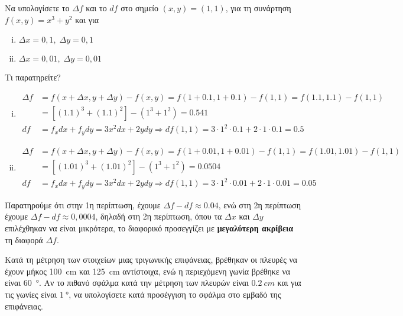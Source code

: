 \begin{example}
  Να υπολογίσετε το $ \Delta f $ και το $ df $ στο σημείο $ (x,y) = (1,1) $, 
  για τη συνάρτηση $ f(x,y) = x^{3}+y^{2} $ και για 
  \begin{enumerate}[i)]
    \item $ \Delta x = 0,1, \; \Delta y = 0,1 $
    \item $ \Delta x = 0,01, \; \Delta y = 0,01 $
  \end{enumerate}
  Τι παρατηρείτε?
\end{example}
\begin{solution}
\item {}
  \begin{enumerate}[i)]
    \item 
      \begin{align*} 
        \Delta f &= f(x+ \Delta x, y + \Delta y) - f(x,y) = f(1+0.1,1+0.1) - 
        f(1,1) = f(1.1,1.1) - f(1,1) \\ 
                 &= [(1.1)^{3}+(1.1)^{2}] - (1^{3}+1^{2}) = 0.541 \\
        df &= f_{x}dx + f_{y}dy  = 3x^{2} dx + 2y dy \Rightarrow df (1,1) = 
        3\cdot 1^{2} \cdot 0.1 + 2 \cdot 1 \cdot 0.1 = 0.5 
      \end{align*}
    \item 
      \begin{align*} 
        \Delta f &= f(x+ \Delta x, y + \Delta y) - f(x,y) = f(1+0.01,1+0.01) - 
        f(1,1) = f(1.01,1.01) - f(1,1) \\ 
                 &= [(1.01)^{3}+(1.01)^{2}] - (1^{3}+1^{2}) = 0.0504 \\
        df &= f_{x}dx + f_{y}dy  = 3x^{2} dx + 2y dy \Rightarrow df (1,1) = 
        3\cdot 1^{2} \cdot 0.01 + 2 \cdot 1 \cdot 0.01 = 0.05 
      \end{align*}
  \end{enumerate}
  Παρατηρούμε ότι στην 1η περίπτωση, έχουμε
  $ \Delta f - df \approx 0.04 $, ενώ στη 2η περίπτωση έχουμε $ \Delta f - df \approx 
  0,0004 $, δηλαδή στη 2η περίπτωση, όπου τα $ \Delta x $ και $ \Delta y $ επιλέχθηκαν 
  να είναι μικρότερα, το διαφορικό προσεγγίζει με \textbf{μεγαλύτερη ακρίβεια} τη 
  διαφορά $ \Delta f $.
\end{solution}

\begin{example}
  Κατά τη μέτρηση των στοιχείων μιας τριγωνικής επιφάνειας, βρέθηκαν οι πλευρές να 
  έχουν μήκος \SI{100}{cm} και \SI{125}{cm} αντίστοιχα, ενώ η περιεχόμενη γωνία βρέθηκε 
  να είναι \SI{60}{\degree}. Αν το πιθανό σφάλμα κατά την μέτρηση των πλευρών είναι 
  $ \SI{0.2}{cm} $ και για τις γωνίες είναι $ \SI{1}{\degree} $, να υπολογίσετε κατά 
  προσέγγιση το σφάλμα στο εμβαδό της επιφάνειας.
\end{example}

